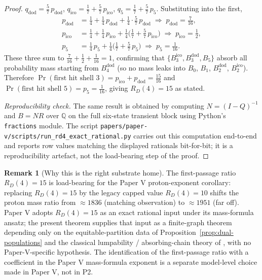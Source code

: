 \documentclass[11pt, a4paper]{amsart}
\theoremstyle{definition}
\newtheorem{remark}[theorem]{Remark}
\newcommand{\Q}{\mathbb{Q}}
\begin{document}
\begin{proof}
$q_{\text{dod}} = \tfrac{5}{7}\,p_{\text{dod}}$,
$q_{\text{ico}} = \tfrac{1}{7} + \tfrac{5}{7}\,p_{\text{ico}}$,
$q_5 = \tfrac{1}{7} + \tfrac{5}{7}\,p_5$. Substituting into the
first,
\begin{align*}
p_{\text{dod}}  &= \tfrac{1}{4} + \tfrac{1}{4}\,p_{\text{dod}}
                 + \tfrac{1}{4}\cdot\tfrac{5}{7}\,p_{\text{dod}}
                 \;\Rightarrow\; p_{\text{dod}} = \tfrac{7}{16}, \\
p_{\text{ico}}  &= \tfrac{1}{4} + \tfrac{1}{4}\,p_{\text{ico}}
                 + \tfrac{1}{4}\bigl(\tfrac{1}{7}
                 + \tfrac{5}{7}\,p_{\text{ico}}\bigr)
                 \;\Rightarrow\; p_{\text{ico}} = \tfrac{1}{2}, \\
p_5             &= \tfrac{1}{4}\,p_5
                 + \tfrac{1}{4}\bigl(\tfrac{1}{7}
                 + \tfrac{5}{7}\,p_5\bigr)
                 \;\Rightarrow\; p_5 = \tfrac{1}{16}.
\end{align*}
These three sum to $\tfrac{7}{16} + \tfrac{1}{2} + \tfrac{1}{16}
= 1$, confirming that $\{B_3^{\mathrm{ico}}, B_3^{\mathrm{dod}},
B_5\}$ absorb all probability mass starting from
$B_4^{\mathrm{dod}}$ (so no mass leaks into $B_0$, $B_1$,
$B_2^{\mathrm{dod}}$, $B_2^{\mathrm{ico}}$). Therefore
$\Pr(\text{first hit shell }3) = p_{\text{ico}} + p_{\text{dod}}
= \tfrac{15}{16}$ and
$\Pr(\text{first hit shell }5) = p_5 = \tfrac{1}{16}$, giving
$R_D(4) = 15$ as stated.

\emph{Reproducibility check.} The same result is obtained by
computing $N = (I - Q)^{-1}$ and $B = N R$ over $\Q$ on the full
six-state transient block using Python's \texttt{fractions}
module. The script
\verb|papers/paper-v/scripts/run_rd4_exact_rational.py| carries
out this computation end-to-end and reports row values matching
the displayed rationals bit-for-bit; it is a reproducibility
artefact, not the load-bearing step of the proof.
\end{proof}

\begin{remark}[Why this is the right substrate home]
The first-passage ratio $R_D(4) = 15$ is load-bearing for the
Paper V proton-exponent corollary: replacing $R_D(4) = 15$ by the
legacy capped value $R_D(4) = 10$ shifts the proton mass ratio
from $\approx 1836$ (matching observation) to $\approx 1951$
(far off). Paper V adopts $R_D(4) = 15$ as an exact rational input
under its mass-formula ansatz; the present theorem supplies that
input as a finite-graph theorem depending only on the
equitable-partition data of
Proposition~\ref{prop:dual-populations} and the classical
lumpability / absorbing-chain theory of
\cite{KemenySnell1976, GodsilRoyle2001}, with no Paper-V-specific
hypothesis. The identification of the first-passage ratio with a
coefficient in the Paper V mass-formula exponent is a separate
model-level choice made in Paper V, not in P2.
\end{remark}
\end{document}
